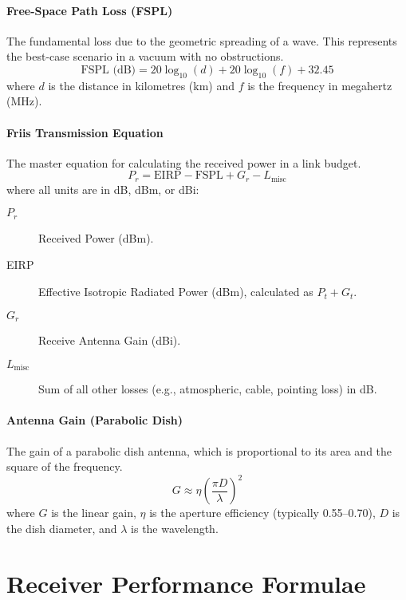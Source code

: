 \paragraph{Free-Space Path Loss (FSPL)}
The fundamental loss due to the geometric spreading of a wave. This represents the best-case scenario in a vacuum with no obstructions.
\begin{equation}
    \text{FSPL (dB)} = 20\log_{10}(d) + 20\log_{10}(f) + 32.45
\end{equation}
where \(d\) is the distance in kilometres (km) and \(f\) is the frequency in megahertz (MHz).

\paragraph{Friis Transmission Equation}
The master equation for calculating the received power in a link budget.
\begin{equation}
    P_{r} = \text{EIRP} - \text{FSPL} + G_{r} - L_{\text{misc}}
\end{equation}
where all units are in dB, dBm, or dBi:
\begin{description}
    \item[\(P_{r}\)] Received Power (dBm).
    \item[EIRP] Effective Isotropic Radiated Power (dBm), calculated as \(P_{t} + G_{t}\).
    \item[\(G_{r}\)] Receive Antenna Gain (dBi).
    \item[\(L_{\text{misc}}\)] Sum of all other losses (e.g., atmospheric, cable, pointing loss) in dB.
\end{description}

\paragraph{Antenna Gain (Parabolic Dish)}
The gain of a parabolic dish antenna, which is proportional to its area and the square of the frequency.
\begin{equation}
    G \approx \eta \left(\frac{\pi D}{\lambda}\right)^2
\end{equation}
where \(G\) is the linear gain, \(\eta\) is the aperture efficiency (typically 0.55--0.70), \(D\) is the dish diameter, and \(\lambda\) is the wavelength.

\section{Receiver Performance Formulae}


